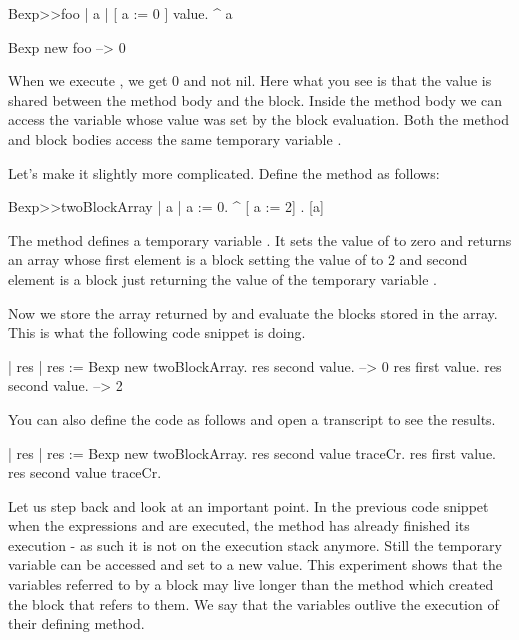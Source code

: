 \documentclass[a4paper,10pt,twoside]{book}
\begin{document}
\begin{code}{}
Bexp>>foo
	| a |
	[ a := 0 ] value.
	^ a
	
Bexp new foo
   --> 0	
\end{code}

When we execute , we get 0 and not nil.
Here what you see is that the value is shared between the method body and the block. Inside the method body we can access the variable whose value was set by the block evaluation.
Both the method  and block bodies access the same temporary variable .

Let's make it slightly more complicated. Define the method  as follows:

\begin{code}{}
Bexp>>twoBlockArray
	| a |
	a := 0.
	^ {[ a := 2] . [a]}
\end{code}

The method  defines a temporary variable . It sets the value of 
to zero and returns an array whose first element is a block setting the value of  to 2 and second element is a block just returning the value of the temporary variable .

Now we store the array returned by  and evaluate the blocks stored in the array. This is what the following code snippet is doing.

\begin{code}{}
| res |
res := Bexp new twoBlockArray.
res second value. --> 0
res first value.
res second value. --> 2
\end{code}

You can also define the code as follows and open a transcript to see the results.

\begin{code}{}
| res |
res := Bexp new twoBlockArray.
res second value traceCr.
res first value.
res second value traceCr.
\end{code}

Let us step back and look at an important point.
In the previous code snippet when the expressions  and  are executed, the method  has already finished its execution - as such it is not on the execution stack anymore.  Still the temporary variable  can be accessed and set to a new value. This experiment shows that the variables referred to by a block may live longer than the method which created the block that refers to them. We say that the variables outlive the execution of their defining method.
\end{document}
